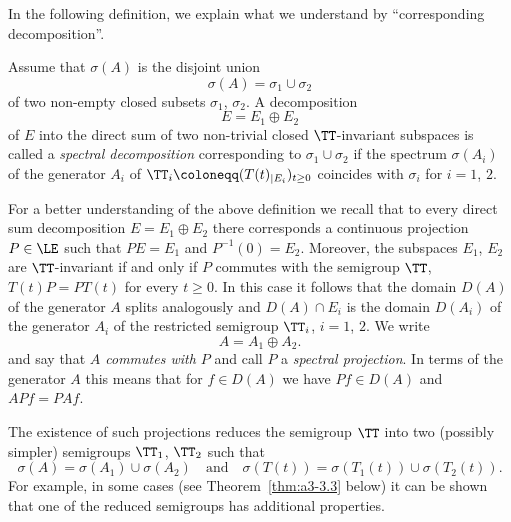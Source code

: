 In the following definition, we explain what we understand by \enquote{corresponding decomposition}.
\begin{definition}\label{def:a3-3.1}
Assume that $\sigma(A)$ is the disjoint union
\[
\sigma(A) = \sigma_{1} \cup \sigma_{2}
\]
of two non-empty closed subsets $\sigma_{1}$, $\sigma_{2}$.
A decomposition
\[
E = E_{1} \oplus E_{2}
\]
of\/ $E$ into the direct sum of two non-trivial closed $\TT$-invariant subspaces is called a \emph{spectral decomposition} corresponding to $\sigma_{1} \cup \sigma_{2}$ if the spectrum $\sigma(A_{i})$ of the generator $A_{i}$ of\/ $\TT_{i} \coloneqq (T(t)_{|E_{i}})_{t \geq 0}$ coincides with $\sigma_{i}$ for $i = 1$, $2$.
\end{definition}
For a better understanding of the above definition we recall that to every direct sum decomposition $E = E_{1} \oplus E_{2}$ there corresponds a continuous projection $P \in \LE$ such that $PE = E_{1}$ and $P^{-1}(0) = E_{2}$.
Moreover, the subspaces $E_{1}$, $E_{2}$ are $\TT$-invariant if and only if\/ $P$ commutes with the semigroup $\TT$, \ie $T(t)P = PT(t)$ for every $t \geq 0$.
In this case it follows that the domain $D(A)$ of the generator $A$ splits analogously and $D(A) \cap E_{i}$ is the domain $D(A_{i})$ of the generator $A_{i}$ of the restricted semigroup $\TT_{i}$, $i = 1$, $2$.
We write
\[
A = A_{1} \oplus A_{2} .
\]
and say that \emph{$A$ commutes with $P$} and call $P$ a \emph{spectral projection}. 
In terms of the generator $A$ this means that for $f \in D(A)$ we have $Pf \in D(A)$ and $APf = PAf$.

The existence of such projections reduces the semigroup $\TT$ into two (possibly simpler) semigroups $\TT_{1}$, $\TT_{2}$ such that
\[
\sigma(A) = \sigma(A_{1}) \cup \sigma(A_{2}) \quad \text{and} \quad \sigma(T(t)) = \sigma(T_{1}(t)) \cup \sigma(T_{2}(t)) .
\]
For example, in some cases (see Theorem~\ref{thm:a3-3.3} below) it can be shown that one of the reduced semigroups has additional properties.

